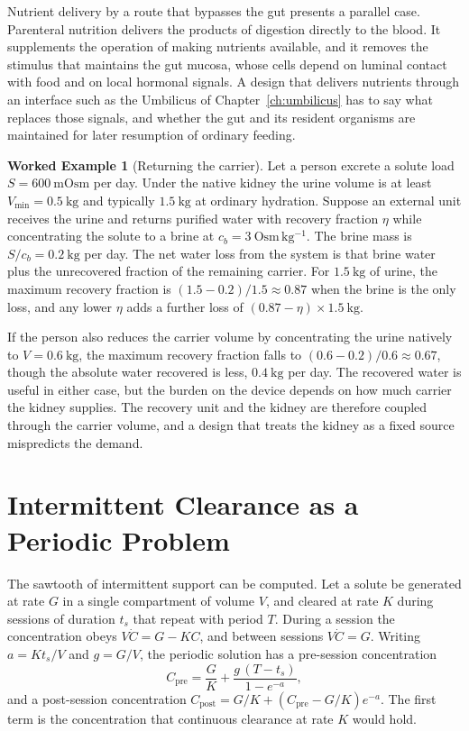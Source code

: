 \documentclass[11pt,openany]{book}
\theoremstyle{definition}
\newtheorem{example}{Worked Example}[chapter]
\theoremstyle{remark}
\begin{document}
Nutrient delivery by a route that bypasses the gut presents a parallel case. Parenteral nutrition delivers the products of digestion directly to the blood. It supplements the operation of making nutrients available, and it removes the stimulus that maintains the gut mucosa, whose cells depend on luminal contact with food and on local hormonal signals. A design that delivers nutrients through an interface such as the Umbilicus of Chapter~\ref{ch:umbilicus} has to say what replaces those signals, and whether the gut and its resident organisms are maintained for later resumption of ordinary feeding.

\begin{example}[Returning the carrier]
\label{ex:carrier}
Let a person excrete a solute load $S=600\ \mathrm{mOsm}$ per day. Under the native kidney the urine volume is at least $V_{\min}=0.5\ \mathrm{kg}$ and typically $1.5\ \mathrm{kg}$ at ordinary hydration. Suppose an external unit receives the urine and returns purified water with recovery fraction $\eta$ while concentrating the solute to a brine at $c_b=3\ \mathrm{Osm\,kg^{-1}}$. The brine mass is $S/c_b=0.2\ \mathrm{kg}$ per day. The net water loss from the system is that brine water plus the unrecovered fraction of the remaining carrier. For $1.5\ \mathrm{kg}$ of urine, the maximum recovery fraction is $(1.5-0.2)/1.5\approx0.87$ when the brine is the only loss, and any lower $\eta$ adds a further loss of $(0.87-\eta)\times1.5\ \mathrm{kg}$.

If the person also reduces the carrier volume by concentrating the urine natively to $V=0.6\ \mathrm{kg}$, the maximum recovery fraction falls to $(0.6-0.2)/0.6\approx0.67$, though the absolute water recovered is less, $0.4\ \mathrm{kg}$ per day. The recovered water is useful in either case, but the burden on the device depends on how much carrier the kidney supplies. The recovery unit and the kidney are therefore coupled through the carrier volume, and a design that treats the kidney as a fixed source mispredicts the demand.
\end{example}

\section{Intermittent Clearance as a Periodic Problem}

The sawtooth of intermittent support can be computed. Let a solute be generated at rate $G$ in a single compartment of volume $V$, and cleared at rate $K$ during sessions of duration $t_s$ that repeat with period $T$. During a session the concentration obeys $V\dot C=G-KC$, and between sessions $V\dot C=G$. Writing $a=Kt_s/V$ and $g=G/V$, the periodic solution has a pre-session concentration
\begin{equation}
C_{\mathrm{pre}}=\frac{G}{K}+\frac{g\,(T-t_s)}{1-e^{-a}},
\label{eq:periodic}
\end{equation}
and a post-session concentration $C_{\mathrm{post}}=G/K+(C_{\mathrm{pre}}-G/K)e^{-a}$. The first term is the concentration that continuous clearance at rate $K$ would hold.
\end{document}
